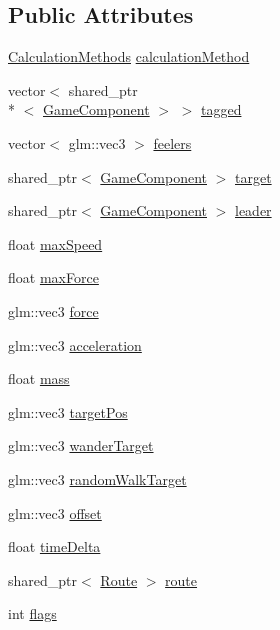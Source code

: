 \subsection*{Public Attributes}
\begin{DoxyCompactItemize}
\item 
\hyperlink{class_b_g_e_1_1_steering_controller_a4d8cb7205fd452a3f742622b6979cf58}{Calculation\-Methods} \hyperlink{class_b_g_e_1_1_steering_controller_a29d6bda0a3029e2ab2e19f860dfe3cb4}{calculation\-Method}
\item 
vector$<$ shared\-\_\-ptr\\*
$<$ \hyperlink{class_b_g_e_1_1_game_component}{Game\-Component} $>$ $>$ \hyperlink{class_b_g_e_1_1_steering_controller_a0bef7f9e4477fa9be8f9679b21aef252}{tagged}
\item 
vector$<$ glm\-::vec3 $>$ \hyperlink{class_b_g_e_1_1_steering_controller_a4bfeb793b7a81b378d3f81c5085b204e}{feelers}
\item 
shared\-\_\-ptr$<$ \hyperlink{class_b_g_e_1_1_game_component}{Game\-Component} $>$ \hyperlink{class_b_g_e_1_1_steering_controller_aa692367fc05dd499a1cc55995147a76a}{target}
\item 
shared\-\_\-ptr$<$ \hyperlink{class_b_g_e_1_1_game_component}{Game\-Component} $>$ \hyperlink{class_b_g_e_1_1_steering_controller_a903b58bdfc1ffa2da91a0cb4e86709cd}{leader}
\item 
float \hyperlink{class_b_g_e_1_1_steering_controller_abd6d971966780e0bcd3f8f8354cf816d}{max\-Speed}
\item 
float \hyperlink{class_b_g_e_1_1_steering_controller_ae5cdce26a0b042668ed31e89975bd9f4}{max\-Force}
\item 
glm\-::vec3 \hyperlink{class_b_g_e_1_1_steering_controller_ad10b3de08abf1b1d18b72628012fd011}{force}
\item 
glm\-::vec3 \hyperlink{class_b_g_e_1_1_steering_controller_ad213909130f9be8f16bb22b4ba18315c}{acceleration}
\item 
float \hyperlink{class_b_g_e_1_1_steering_controller_aef56ff8322c205106e1fda10a7a6163a}{mass}
\item 
glm\-::vec3 \hyperlink{class_b_g_e_1_1_steering_controller_a0484eb39c0aaf8b38caf6e2aa836fc05}{target\-Pos}
\item 
glm\-::vec3 \hyperlink{class_b_g_e_1_1_steering_controller_ab6afb73864e6da7472bc49a725257c67}{wander\-Target}
\item 
glm\-::vec3 \hyperlink{class_b_g_e_1_1_steering_controller_a73ebb24f070f82ea198c6ee7d2713730}{random\-Walk\-Target}
\item 
glm\-::vec3 \hyperlink{class_b_g_e_1_1_steering_controller_ae105c8426aa2bf9856ea0e53d95a366c}{offset}
\item 
float \hyperlink{class_b_g_e_1_1_steering_controller_a2663615d3340930be34a999daa7f735b}{time\-Delta}
\item 
shared\-\_\-ptr$<$ \hyperlink{class_b_g_e_1_1_route}{Route} $>$ \hyperlink{class_b_g_e_1_1_steering_controller_a17816a6268bc4055a01c5c90eb505320}{route}
\item 
int \hyperlink{class_b_g_e_1_1_steering_controller_a8e3bba21f8c3f425b6a591b9c85d9c90}{flags}
\end{DoxyCompactItemize}


